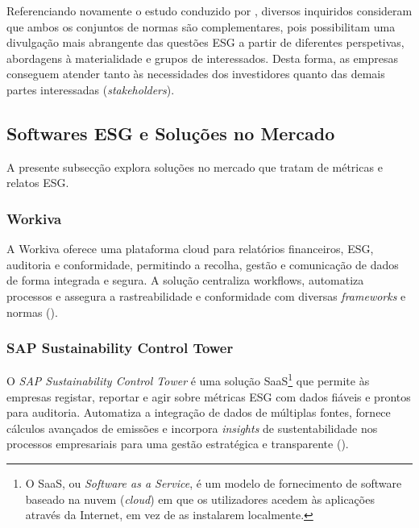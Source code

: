 Referenciando novamente o estudo conduzido por \cite{GRISASB2021}, diversos inquiridos consideram que ambos os conjuntos de normas são complementares, pois possibilitam uma divulgação mais abrangente das questões ESG a partir de diferentes perspetivas, abordagens à materialidade e grupos de interessados. Desta forma, as empresas conseguem atender tanto às necessidades dos investidores quanto das demais partes interessadas (\textit{stakeholders}).


\subsection{Softwares ESG e Soluções no Mercado}
\label{subsec: SESGSM}

A presente subsecção explora soluções no mercado que tratam de métricas e relatos ESG.

\subsubsection{Workiva}

A Workiva oferece uma plataforma cloud para relatórios financeiros, ESG, auditoria e conformidade, permitindo a recolha, gestão e comunicação de dados de forma integrada e segura. A solução centraliza workflows, automatiza processos e assegura a rastreabilidade e conformidade com diversas \textit{frameworks} e normas (\cite{Workiva2025}).


\subsubsection{SAP Sustainability Control Tower}

O \textit{SAP Sustainability Control Tower} é uma solução SaaS\footnote{O SaaS, ou \textit{Software as a Service}, é um modelo de fornecimento de software baseado na nuvem (\textit{cloud}) em que os utilizadores acedem às aplicações através da Internet, em vez de as instalarem  localmente.} que permite às empresas registar, reportar e agir sobre métricas ESG com dados fiáveis e prontos para auditoria. Automatiza a integração de dados de múltiplas fontes, fornece cálculos avançados de emissões e incorpora \textit{insights} de sustentabilidade nos processos empresariais para uma gestão estratégica e transparente (\cite{SAP2025}).

